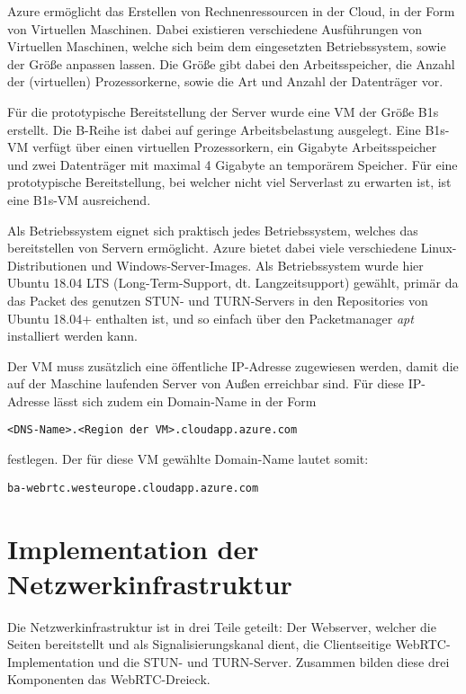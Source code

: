 Azure ermöglicht das Erstellen von Rechnenressourcen in der Cloud, in der Form von Virtuellen Maschinen. Dabei existieren verschiedene Ausführungen von Virtuellen Maschinen, welche sich beim dem eingesetzten Betriebssystem, sowie der \glqq{}Größe\grqq{} anpassen lassen. Die Größe gibt dabei den Arbeitsspeicher, die Anzahl der (virtuellen) Prozessorkerne, sowie die Art und Anzahl der Datenträger vor.\par

Für die prototypische Bereitstellung der Server wurde eine \acf{VM} der Größe \glqq{}B1s\grqq{} erstellt. Die B-Reihe ist dabei auf geringe Arbeitsbelastung ausgelegt. Eine B1s-VM verfügt über einen virtuellen Prozessorkern, ein Gigabyte Arbeitsspeicher und zwei Datenträger mit maximal 4 Gigabyte an temporärem Speicher. Für eine prototypische Bereitstellung, bei welcher nicht viel Serverlast zu erwarten ist, ist eine B1s-VM ausreichend.\par

Als Betriebssystem eignet sich praktisch jedes Betriebssystem, welches das bereitstellen von Servern ermöglicht. Azure bietet dabei viele verschiedene Linux-Distributionen und Windows-Server-Images. Als Betriebssystem wurde hier Ubuntu 18.04 LTS (Long-Term-Support, dt. Langzeitsupport) gewählt, primär da das Packet des genutzen STUN- und TURN-Servers in den Repositories von Ubuntu 18.04+ enthalten ist, und so einfach über den Packetmanager \textit{apt} installiert werden kann.\par

Der \acs{VM} muss zusätzlich eine öffentliche IP-Adresse zugewiesen werden, damit die auf der Maschine laufenden Server von Außen erreichbar sind. Für diese IP-Adresse lässt sich zudem ein Domain-Name in der Form
\lstset{style=STYLE_COMMAND_LINE_ARGUMENT_SINGLE_LINE}
\begin{lstlisting}[belowskip=-0.8 \baselineskip]
<DNS-Name>.<Region der VM>.cloudapp.azure.com
\end{lstlisting}
festlegen. Der für diese VM gewählte Domain-Name lautet somit:
\lstset{style=STYLE_COMMAND_LINE_ARGUMENT_SINGLE_LINE}
\begin{lstlisting}[belowskip=-0.8 \baselineskip]
ba-webrtc.westeurope.cloudapp.azure.com
\end{lstlisting}

\section{Implementation der Netzwerkinfrastruktur}
Die Netzwerkinfrastruktur ist in drei Teile geteilt: Der Webserver, welcher die Seiten bereitstellt und als Signalisierungskanal dient, die Clientseitige WebRTC-Implementation und die \acs{STUN}- und \acs{TURN}-Server. Zusammen bilden diese drei Komponenten das \glqq{}WebRTC-Dreieck\grqq{}.


